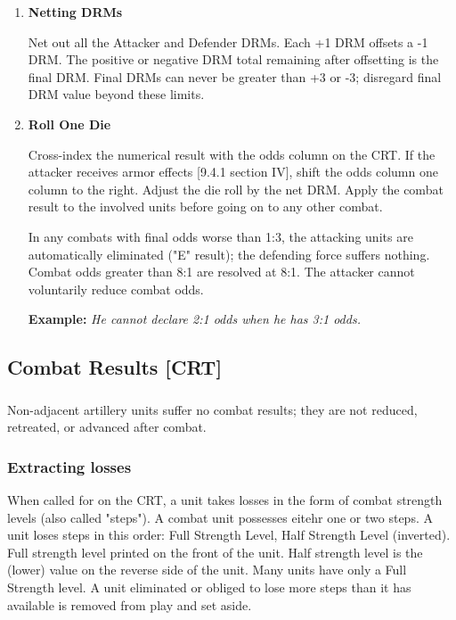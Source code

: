 \begin{enumerate}[label=\textbf{\Roman*.}]
    \item \textbf{Netting DRMs}
    
    Net out all the Attacker and Defender DRMs. Each +1 DRM offsets a -1 DRM. The positive or negative DRM total remaining after offsetting is the final DRM. Final DRMs can never be greater than +3 or -3; disregard final DRM value beyond these limits.
    
    \item \textbf{Roll One Die}
    
    Cross-index the numerical result with the odds column on the CRT. If the attacker receives armor effects [9.4.1 section IV], shift the odds column one column to the right. Adjust the die roll by the net DRM. Apply the combat result to the involved units before going on to any other combat.
    
    In any combats with final odds worse than 1:3, the attacking units are automatically eliminated ("E" result); the defending force suffers nothing. Combat odds greater than 8:1 are resolved at 8:1. The attacker cannot voluntarily reduce combat odds.
    
    \textbf{Example:} \textit{He cannot declare 2:1 odds when he has 3:1 odds.}
\end{enumerate}

\subsection{Combat Results [CRT]}
\subsubsection{}
Non-adjacent artillery units suffer no combat results; they are not reduced, retreated, or advanced after combat.

\subsubsection{\textbf{Extracting losses}}
When called for on the CRT, a unit takes losses in the form of combat strength levels (also called "steps"). A combat unit possesses eitehr one or two steps. A unit loses steps in this order: Full Strength Level, Half Strength Level (inverted). Full strength level printed on the front of the unit. Half strength level is the (lower) value on the reverse side of the unit. Many units have only a Full Strength level. A unit eliminated or obliged to lose more steps than it has available is removed from play and set aside.

